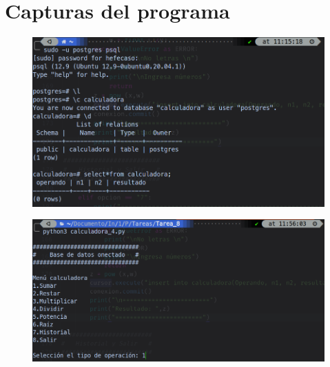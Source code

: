 \documentclass[12pt,letterpaper]{article}
\begin{document}



\section{Capturas del programa}

\begin{multicols}{2}

\begin{figure}[H]
\centering
\includegraphics[width = \columnwidth]{calc_1.png}
\end{figure}

\begin{figure}[H]
\centering
\includegraphics[width = \columnwidth]{calc_2.png}
\end{figure}


\end{multicols}
\end{document}
